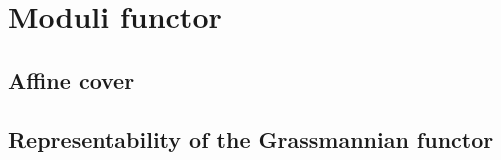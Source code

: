 \section{Moduli functor}

\subsection{Affine cover}

\subsection{Representability of the Grassmannian functor}